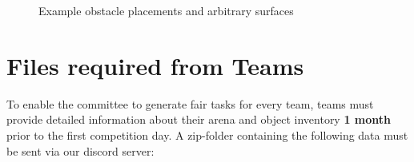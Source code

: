 \begin{figure} [h!]
\begin{center}
 \hspace{1cm}
\end{center}
\caption{Example obstacle placements and arbitrary surfaces}
\label{fig:vrc_obst_arbi}
\end{figure}

\section{Files required from Teams}

To enable the committee to generate fair tasks for every team, teams must provide detailed information about their arena and object inventory \textbf{1 month} prior to the first competition day. A zip-folder containing the following data must be sent via our discord server:

